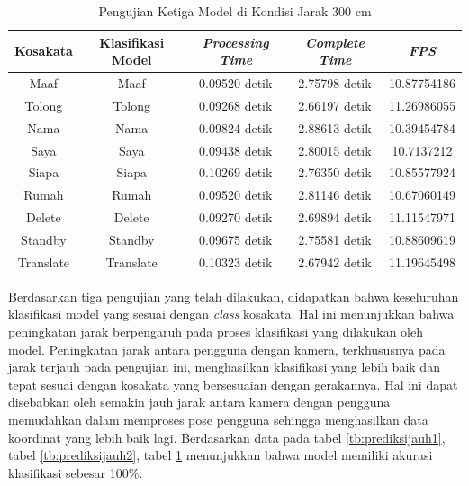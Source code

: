 \begin{longtable}{|c|c|c|c|c|}
  \caption{Pengujian Ketiga Model di Kondisi Jarak 300 cm}
  \label{tb:prediksijauh3}                                   \\
  \hline
  \rowcolor[HTML]{C0C0C0}
  \textbf{Kosakata} & \textbf{Klasifikasi Model} & \textbf{\emph{Processing Time}} & \textbf{\emph{Complete Time}} & \textbf{\emph{FPS}}\\
  \hline
  Maaf              & Maaf                          & 0.09520 detik                           & 2.75798 detik                                  & 10.87754186\\
  Tolong            & Tolong                        & 0.09268 detik                           & 2.66197 detik                                  & 11.26986055\\
  Nama              & Nama                          & 0.09824 detik                           & 2.88613 detik                                  & 10.39454784\\
  Saya              & Saya                          & 0.09438 detik                           & 2.80015 detik                                  & 10.7137212\\
  Siapa             & Siapa                         & 0.10269 detik                           & 2.76350 detik                                  & 10.85577924\\
  Rumah             & Rumah                          & 0.09520 detik                           & 2.81146 detik                                  & 10.67060149\\
  Delete            & Delete                        & 0.09270 detik                           & 2.69894 detik                                  & 11.11547971\\
  Standby           & Standby                       & 0.09675 detik                           & 2.75581 detik                                  & 10.88609619\\
  Translate         & Translate                     & 0.10323 detik                           & 2.67942 detik                                  & 11.19645498\\
  \hline
\end{longtable}



Berdasarkan tiga pengujian yang telah dilakukan, didapatkan bahwa keseluruhan klasifikasi model yang sesuai dengan \emph{class} kosakata. Hal ini menunjukkan bahwa peningkatan jarak berpengaruh pada proses klasifikasi yang dilakukan oleh model. Peningkatan jarak antara pengguna dengan kamera, terkhususnya pada jarak terjauh pada pengujian ini, menghasilkan klasifikasi yang lebih baik dan tepat sesuai dengan kosakata yang bersesuaian dengan gerakannya. Hal ini dapat disebabkan oleh semakin jauh jarak antara kamera dengan pengguna memudahkan dalam memproses pose pengguna sehingga menghasilkan data koordinat yang lebih baik lagi. Berdasarkan data pada tabel \ref{tb:prediksijauh1}, tabel \ref{tb:prediksijauh2}, tabel \ref{tb:prediksijauh3} menunjukkan bahwa model memiliki akurasi klasifikasi sebesar 100\%.

